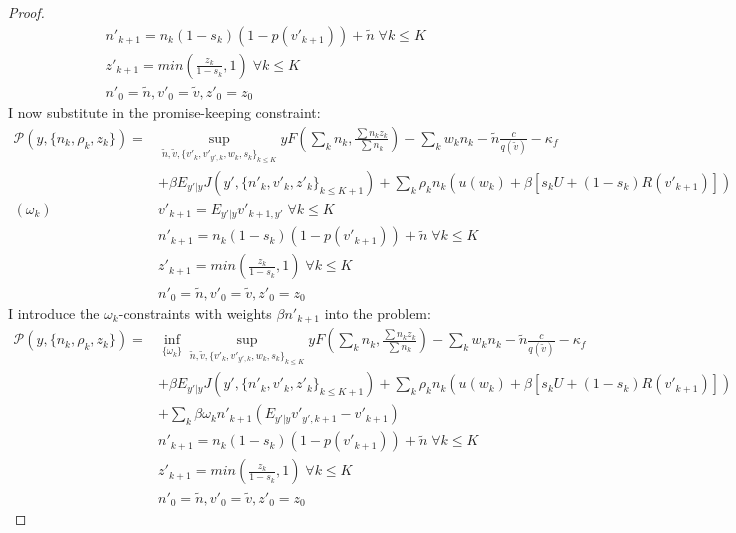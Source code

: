 \begin{proof}
\begin{equation*}
\begin{split}
    & n'_{k+1} = n_k(1-s_k)(1-p(v'_{k+1}))+\tilde{n}\; \forall k\leq K \\
    & z'_{k+1} = min(\frac{z_k}{1-s_k},1)\; \forall k\leq K \\
    & n'_0 = \tilde{n}, v'_0 = \tilde{v}, z'_0 = z_0
    \end{split}
\end{equation*}
I now substitute in the promise-keeping constraint:
\begin{equation*}
    \begin{split}
 \mathcal{P}(y,\{n_k,\rho_k,z_k\}) =
    & \sup_{\tilde{n},\tilde{v},\{v'_k,v'_{y',k},w_{k},s_{k}\}_{k\leq K}} 
    yF(\sum_k n_k,\frac{\sum n_kz_k}{\sum n_k})-
    \sum_k w_kn_k
    -\tilde{n}\frac{c}{q(\tilde{v})}-\kappa_f \\
    & +\beta E_{y'|y} J(y',\{n'_k,v'_k,z'_k\}_{k\leq K+1}) + \sum_k \rho_k n_k (u(w_k) + \beta [s_k U + (1-s_k)R(v'_{k+1})])  \\
(\omega_k) \:    & v'_{k+1} = E_{y'|y} v'_{k+1,y'} \; \forall k\leq K \\
    & n'_{k+1} = n_k(1-s_k)(1-p(v'_{k+1}))+\tilde{n}\; \forall k\leq K \\
    & z'_{k+1} = min(\frac{z_k}{1-s_k},1)\; \forall k\leq K \\
    & n'_0 = \tilde{n}, v'_0 = \tilde{v}, z'_0 = z_0
    \end{split}
\end{equation*}
I introduce the $\omega_k$-constraints with weights $\beta n'_{k+1}$ into the problem:
\begin{equation*}
    \begin{split}
 \mathcal{P}(y,\{n_k,\rho_k,z_k\}) =
    & \inf_{\{\omega_k\}}\sup_{\tilde{n},\tilde{v},\{v'_k,v'_{y',k},w_{k},s_{k}\}_{k\leq K}} 
    yF(\sum_k n_k,\frac{\sum n_kz_k}{\sum n_k})-
    \sum_k w_kn_k
    -\tilde{n}\frac{c}{q(\tilde{v})}-\kappa_f \\
    & +\beta E_{y'|y} J(y',\{n'_k,v'_k,z'_k\}_{k\leq K+1}) + \sum_k \rho_k n_k (u(w_k) + \beta [s_k U + (1-s_k)R(v'_{k+1})])  \\
    & + \sum_k \beta\omega_kn'_{k+1}(E_{y'|y}v'_{y',k+1}-v'_{k+1})\\
    & n'_{k+1} = n_k(1-s_k)(1-p(v'_{k+1}))+\tilde{n}\; \forall k\leq K \\
    & z'_{k+1} = min(\frac{z_k}{1-s_k},1)\; \forall k\leq K \\
    & n'_0 = \tilde{n}, v'_0 = \tilde{v}, z'_0 = z_0

\end{split}
\end{equation*}
\end{proof}
